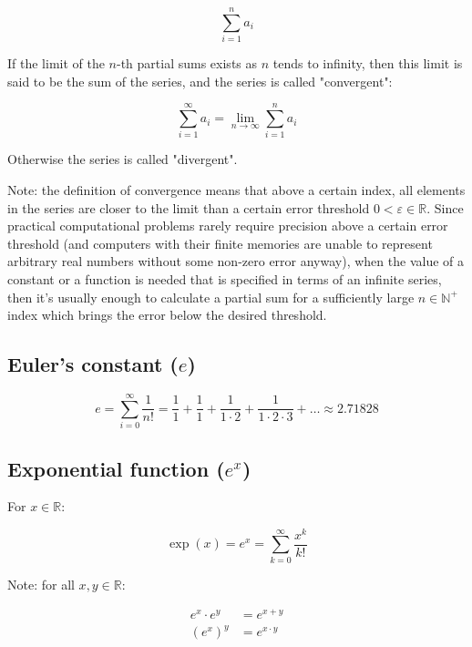 \documentclass{article}
\begin{document}
        $$\sum_{i=1}^n a_i$$

        If the limit of the $n$-th partial sums exists as $n$ tends to infinity,
        then this limit is said to be the sum of the series, and the series is
        called "convergent":

        $$\sum_{i=1}^\infty a_i = \lim_{n \to \infty} \sum_{i=1}^n a_i$$

        Otherwise the series is called "divergent".

        Note: the definition of convergence means that above a certain index,
        all elements in the series are closer to the limit than a certain
        error threshold $0 < \varepsilon \in \mathbb{R}$. Since practical
        computational problems rarely require precision above a certain error
        threshold (and computers with their finite memories are unable to
        represent arbitrary real numbers without some non-zero error anyway),
        when the value of a constant or a function is needed that is specified
        in terms of an infinite series, then it's usually enough to calculate a
        partial sum for a sufficiently large $n \in \mathbb{N}^+$ index which
        brings the error below the desired threshold.

      \subsection{Euler's constant ($e$)}

        $$
          e = \sum_{i=0}^\infty \frac{1}{n!}
            = \frac{1}{1}
              + \frac{1}{1}
              + \frac{1}{1 \cdot 2}
              + \frac{1}{1 \cdot 2 \cdot 3}
              + \ldots
            \approx 2.71828
        $$

      \subsection{Exponential function ($e^x$)}

        For $x \in \mathbb{R}$:

        $$\exp(x) = e^x = \sum_{k=0}^\infty \frac{x^k}{k!}$$

        Note: for all $x, y \in \mathbb{R}$:

        \begin{align*}
          e^x \cdot e^y & = e^{x+y} \\
          \left( e^x \right)^y & = e^{x \cdot y}
        \end{align*}
\end{document}
